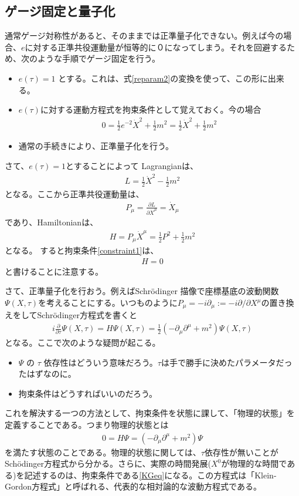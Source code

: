 \documentclass[report,paper=a4, fontsize=12pt, line_length=16cm, number_of_lines=33,dvipdfmx]{jlreq}
\numberwithin{equation}{chapter}
\numberwithin{equation}{section}
\newcommand{\del}{\partial}
\begin{document}
\subsection{ゲージ固定と量子化}
通常ゲージ対称性があると、そのままでは正準量子化できない。例えば今の場合、$e$に対する正準共役運動量が恒等的に０になってしまう。それを回避するため、次のような手順でゲージ固定を行う。
\begin{itemize}
 \item $e(\tau)=1$ とする。これは、式\eqref{reparam2}の変換を使って、この形に出来る。
 \item $e(\tau)$に対する運動方程式を拘束条件として覚えておく。今の場合
\begin{align}
 0=\frac12 e^{-2}\dot{X}^2+\frac12 m^2=\frac12 \dot{X}^2+\frac12 m^2 \label{constraint1}
\end{align}
 \item 通常の手続きにより、正準量子化を行う。
\end{itemize}
さて、$e(\tau)=1$とすることによって Lagrangianは、
\begin{align}
 L=\frac12 \dot{X}^2-\frac12 m^2
\end{align}
となる。ここから正準共役運動量は、
\begin{align}
 P_{\mu}=\frac{\del L}{\del \dot{X}^{\mu}}=\dot{X}_{\mu}
\end{align}
であり、Hamiltonianは、
\begin{align}
 H=P_{\mu}\dot{X}^{\mu}=\frac12 P^2+\frac12 m^2
\end{align}
となる。 すると拘束条件\eqref{constraint1}は、
\begin{align}
 H=0
\end{align}
と書けることに注意する。

さて、正準量子化を行おう。例えばSchr\"odinger 描像で座標基底の波動関数$\Psi(X,\tau)$を考えることにする。いつものように$P_{\mu}=-i\del_{\mu}:=-i\del/\del X^{\mu}$の置き換えをしてSchr\"odinger方程式を書くと
\begin{align}
 i\frac{\del}{\del \tau}\Psi(X,\tau)= H \Psi(X,\tau)=\frac12 (-\del_{\mu}\del^{\mu}+m^2)\Psi(X,\tau)
\end{align}
となる。ここで次のような疑問が起こる。
\begin{itemize}
 \item $\Psi$ の $\tau$ 依存性はどういう意味だろう。$\tau$は手で勝手に決めたパラメータだったはずなのに。
 \item 拘束条件はどうすればいいのだろう。
\end{itemize}
これを解決する一つの方法として、拘束条件を状態に課して、「物理的状態」を定義することである。つまり物理的状態とは
\begin{align}
 0=H\Psi=(-\del_{\mu}\del^{\mu}+m^2)\Psi \label{KGeq}
\end{align}
を満たす状態のことである。物理的状態に関しては、$\tau$依存性が無いことがSch\"odinger方程式から分かる。さらに、実際の時間発展($X^0$が物理的な時間である)を記述するのは、拘束条件である\eqref{KGeq}になる。この方程式は「Klein-Gordon方程式」と呼ばれる、代表的な相対論的な波動方程式である。
\end{document}

